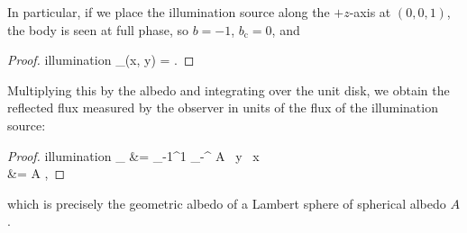 \documentclass[modern]{aastex62}
\begin{document}
In particular, if we place the illumination source along the $+z$-axis at
$(0, 0, 1)$, the body is seen at full phase, so $b = -1$, $b_\mathrm{c} = 0$, and
%
\begin{proof}{illumination}
    _(x, y) = 
    \quad.
\end{proof}
%
Multiplying this by the albedo and integrating over the unit disk,
we obtain the reflected flux measured
by the observer in units of the flux of the illumination source:
%
\begin{proof}{illumination}
    _ &=
    \int_{-1}^{1}
    \int_{-}^{}
    A
    \,
    \dd y
    \,
    \dd x
    \nonumber \\[0.5em]
    &= A
    \quad,
\end{proof}
%
which is precisely the geometric albedo of a Lambert
sphere of spherical albedo $A$ \citep[see, e.g.][]{Seager2010}.
\end{document}
